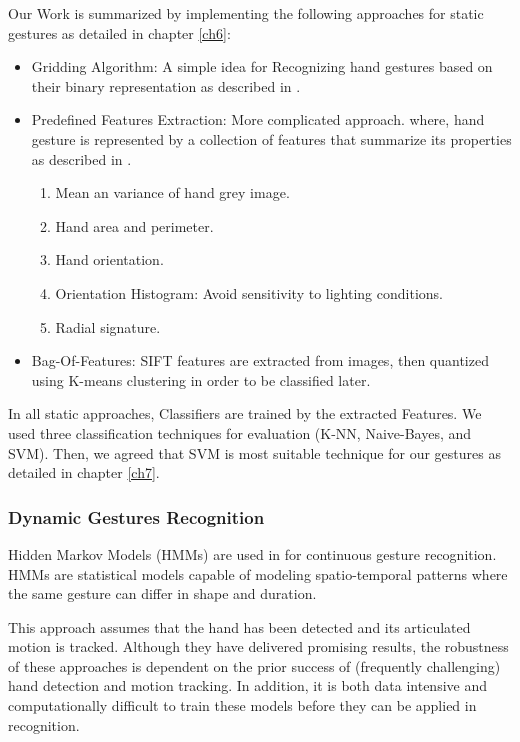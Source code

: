 Our Work is summarized by implementing the following approaches for static gestures as detailed in chapter \ref{ch6}:
\begin{itemize}
\item Gridding Algorithm: A simple idea for Recognizing hand gestures based on their binary representation as described in \cite{paper1sb}.
\bigskip

\item Predefined Features Extraction: More complicated approach. where, hand gesture is represented by a collection of features that summarize its properties as described in \cite{paper2sT}.
\begin{enumerate}
\item Mean an variance of hand grey image.
\item Hand area and perimeter.
\item Hand orientation.
\item Orientation Histogram: Avoid sensitivity to lighting conditions. 
\item Radial signature.
\end{enumerate}
\bigskip

\item Bag-Of-Features: SIFT features are extracted from images, then quantized using K-means clustering in order to be classified later.
\end{itemize}
\bigskip

In all static approaches, Classifiers are trained by the extracted Features. 
We used three classification techniques for evaluation (K-NN, Naive-Bayes, and SVM). Then, we agreed that SVM is most suitable technique for our gestures as detailed in chapter \ref{ch7}.

\subsubsection{Dynamic Gestures Recognition} 
Hidden Markov Models (HMMs) are used in \cite{hoda} for continuous gesture recognition. HMMs are statistical models capable of modeling spatio-temporal patterns where the same gesture can differ in shape and duration.
\bigskip

This approach assumes that the hand has been detected and its articulated motion is tracked. Although they have delivered promising results, the robustness of these approaches is dependent on the prior success of (frequently challenging) hand detection and motion tracking. In addition, it is both data intensive and computationally difficult to train these models before they can be applied in recognition.
\bigskip

